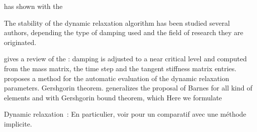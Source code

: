  has shown with the 


The stability of the dynamic relaxation algorithm has been studied several authors, depending the type of damping used and the field of research they are originated. 

gives a review of the 
 : damping is adjusted to a near critical level and computed from the mass matrix, the time step and the tangent stiffness matrix entries.
proposes a method for the automatic evaluation of the dynamic relaxation parameters. Gershgorin theorem.
 generalizes the proposal of Barnes for all kind of elements and with 
Gershgorin bound theorem, which
Here we formulate 


%






Dynamic relaxation~:
\cite{Lewis2003}
En particulier, voir pour un comparatif avec une méthode implicite.

